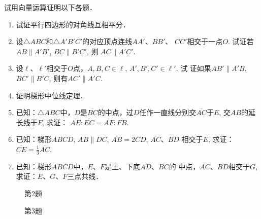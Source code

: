 \begin{ex}
    试用向量运算证明以下各题．
\begin{enumerate}
\item  试证平行四边形的对角线互相平分．
\item 设$\triangle ABC$和$\triangle A'B'C'$的对应顶点连线$AA'$、$BB'$、
    $CC'$相交于一点$O$. 试证若 $AB\parallel A'B'$, $BC\parallel B'C'$, 则
    $AC\parallel A'C'$.

\item 设$\ell$、$\ell'$相交于$O$点，$A,B,C\in\ell$, $A',B',C'\in\ell'$. 试
证如果$AB'\parallel A'B$, $BC'\parallel B'C$, 则有$AC'\parallel A'C$.
\item 证明梯形中位线定理．
\item 已知：$\triangle ABC$中，$D$是$\overline{BC}$的中点，过$D$任作一直线分别交$\overline{AC}$于$E$, 交$AB$的延长线于$F$, 求证：
$\overline{AE}:\overline{EC}=\overline{AF}:\overline{FB}$.
\item 已知：梯形$ABCD$, $AB\parallel DC$, $\overline{AB}=2\overline{CD}$, $\overline{AC}$、$\overline{BD}$
相交于$E$, 求证：$\overline{CE}=\frac{1}{3}\overline{AC}$.
\item 已知：梯形$ABCD$中，$E$、$F$是上、下底$\overline{AD}$、$\overline{BC}$的
中点，$\overline{AC}$、$\overline{BD}$相交于$G$, 求证：$E$、$G$、$F$三点共线．
\end{enumerate}
\end{ex}

\begin{figure}[htp]\centering
    \begin{minipage}[t]{0.48\textwidth}
    \centering
{}
    \caption*{第2题}
    \end{minipage}
    \begin{minipage}[t]{0.48\textwidth}
    \centering
    \caption*{第3题}
    \end{minipage}
    \end{figure}

